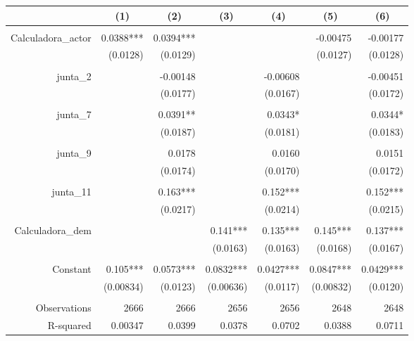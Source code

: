 \begin{tabular}{rrrrrrr}
\toprule
      & \multicolumn{1}{c}{(1)} & \multicolumn{1}{c}{(2)} & \multicolumn{1}{c}{(3)} & \multicolumn{1}{c}{(4)} & \multicolumn{1}{c}{(5)} & \multicolumn{1}{c}{(6)} \\
\midrule
      &       &       &       &       &       &  \\
Calculadora\_actor & 0.0388*** & 0.0394*** &       &       & -0.00475 & -0.00177 \\
      & (0.0128) & (0.0129) &       &       & (0.0127) & (0.0128) \\
      &       &       &       &       &       &  \\
junta\_2 &       & -0.00148 &       & -0.00608 &       & -0.00451 \\
      &       & (0.0177) &       & (0.0167) &       & (0.0172) \\
      &       &       &       &       &       &  \\
junta\_7 &       & 0.0391** &       & 0.0343* &       & 0.0344* \\
      &       & (0.0187) &       & (0.0181) &       & (0.0183) \\
      &       &       &       &       &       &  \\
junta\_9 &       & 0.0178 &       & 0.0160 &       & 0.0151 \\
      &       & (0.0174) &       & (0.0170) &       & (0.0172) \\
      &       &       &       &       &       &  \\
junta\_11 &       & 0.163*** &       & 0.152*** &       & 0.152*** \\
      &       & (0.0217) &       & (0.0214) &       & (0.0215) \\
      &       &       &       &       &       &  \\
Calculadora\_dem &       &       & 0.141*** & 0.135*** & 0.145*** & 0.137*** \\
      &       &       & (0.0163) & (0.0163) & (0.0168) & (0.0167) \\
      &       &       &       &       &       &  \\
Constant & 0.105*** & 0.0573*** & 0.0832*** & 0.0427*** & 0.0847*** & 0.0429*** \\
      & (0.00834) & (0.0123) & (0.00636) & (0.0117) & (0.00832) & (0.0120) \\
      &       &       &       &       &       &  \\
Observations & 2666  & 2666  & 2656  & 2656  & 2648  & 2648 \\
R-squared & 0.00347 & 0.0399 & 0.0378 & 0.0702 & 0.0388 & 0.0711 \\
\bottomrule
\end{tabular}%
